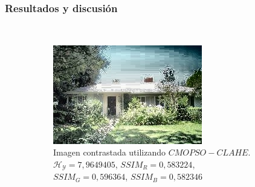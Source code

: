 \documentclass[usenames,dvipsnames]{beamer}
\begin{document}
    \begin{frame}
    \frametitle{Resultados y discusión} 

\begin{figure}[H]
\centering
    ~ %
    \begin{subfigure}[t]{0.45\textwidth}
    \includegraphics[width=\textwidth]{graphics/calhouse_0230_20-62968204656-00.jpg}
    \caption{Imagen contrastada utilizando $CMOPSO-CLAHE$.  $\mathscr{H_Y}=7,9649405$, $SSIM_R=0,583224$, $SSIM_G=0,596364$, $SSIM_B=0,582346$}
    \label{fig:casa1enhanced2}
    \end{subfigure} 
    \begin{subfigure}[t]{0.45\textwidth}

\end{subfigure}
\end{figure}
\end{frame}
\end{document}
